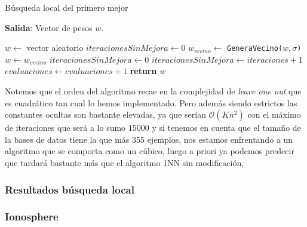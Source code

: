 \begin{algorithm}[H]
  \caption{Búsqueda local del primero mejor}
      \hspace*{\algorithmicindent} 
      \textbf{Salida}:
      Vector de pesos $w$.        
  \begin{algorithmic}[1]
        \State $w \gets$ vector aleatorio  
        \State $iteracionesSinMejora \gets 0$ 
      \State $w_{vecino} \gets$ \texttt{GeneraVecino($w,\sigma$)}
        \State $w \gets w_{vecino}$
        \State $iteracionesSinMejora  \gets 0$ 
      \EndIf
      \State $iteracionesSinMejora  \gets iteraciones +1$
      \State $evaluaciones \gets evaluaciones +1$
      \EndWhile
      \State \textbf{return} $w$
    \EndProcedure
  \end{algorithmic}
\end{algorithm}

Notemos que el orden del algoritmo recae en la complejidad de \textit{leave one out}
que es cuadrático tan cual lo hemos implementado. 
Pero además siendo estrictos las constantes ocultas son bastante elevadas, ya que serían $\mathcal{O}(K n^2)$ con el máximo de iteraciones que será a lo sumo $15000$ y si tenemos en cuenta que el tamaño de la bases de datos tiene la que más 355 ejemplos, nos estamos enfrentando a un algoritmo que se comporta como un cúbico, luego a priori ya podemos predecir que tardará bastante más que el algoritmo 1NN sin modificación,

\subsubsection{Resultados búsqueda local}

\subsubsection*{Ionosphere} 

